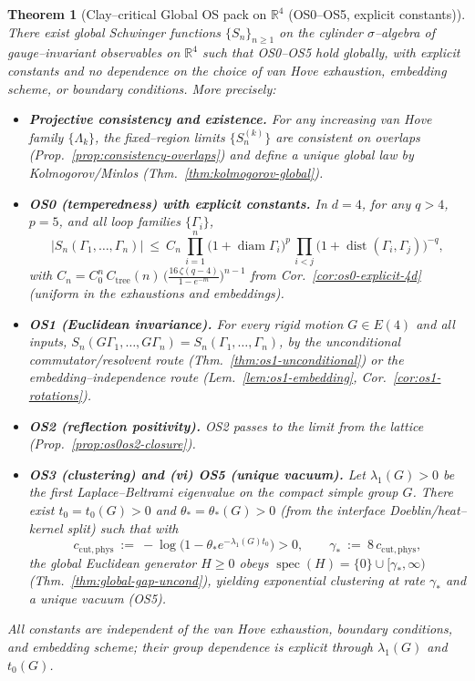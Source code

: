 \documentclass[11pt]{amsart}
\theoremstyle{plain}
\newtheorem{theorem}{Theorem}[section]
\theoremstyle{definition}
\theoremstyle{remark}
\begin{document}
\medskip
\begin{theorem}[Clay–critical Global OS pack on $\mathbb R^4$ (OS0--OS5, explicit constants)]\label{thm:global-os-clay}
There exist global Schwinger functions $\{S_n\}_{n\ge1}$ on the cylinder $\sigma$--algebra of gauge--invariant observables on $\mathbb R^4$ such that OS0--OS5 hold globally, with explicit constants and no dependence on the choice of van Hove exhaustion, embedding scheme, or boundary conditions. More precisely:
\begin{itemize}
  \item[(i)] \textbf{Projective consistency and existence.} For any increasing van Hove family $\{\Lambda_k\}$, the fixed–region limits $\{S_n^{(k)}\}$ are consistent on overlaps (Prop.~\ref{prop:consistency-overlaps}) and define a unique global law by Kolmogorov/Minlos (Thm.~\ref{thm:kolmogorov-global}).
  \item[(ii)] \textbf{OS0 (temperedness) with explicit constants.} In $d=4$, for any $q>4$, $p=5$, and all loop families $\{\Gamma_i\}$,
  \[
    |S_n(\Gamma_1,\ldots,\Gamma_n)|\ \le\ C_n\,\prod_{i=1}^n \bigl(1+\operatorname{diam}\Gamma_i\bigr)^p\,\prod_{i<j}\bigl(1+\operatorname{dist}(\Gamma_i,\Gamma_j)\bigr)^{-q},
  \]
  with $C_n=C_0^n\,C_{\mathrm{tree}}(n)\,\Big(\frac{16\,\zeta(q-4)}{1-e^{-m}}\Big)^{\!n-1}$ from Cor.~\ref{cor:os0-explicit-4d} (uniform in the exhaustions and embeddings).
  \item[(iii)] \textbf{OS1 (Euclidean invariance).} For every rigid motion $G\in E(4)$ and all inputs, $S_n(G\Gamma_1,\ldots,G\Gamma_n)=S_n(\Gamma_1,\ldots,\Gamma_n)$, by the unconditional commutator/resolvent route (Thm.~\ref{thm:os1-unconditional}) or the embedding–independence route (Lem.~\ref{lem:os1-embedding}, Cor.~\ref{cor:os1-rotations}).
  \item[(iv)] \textbf{OS2 (reflection positivity).} OS2 passes to the limit from the lattice (Prop.~\ref{prop:os0os2-closure}).
  \item[(v)] \textbf{OS3 (clustering) and (vi) OS5 (unique vacuum).} Let $\lambda_1(G)>0$ be the first Laplace–Beltrami eigenvalue on the compact simple group $G$. There exist $t_0=t_0(G)>0$ and $\theta_*=\theta_*(G)>0$ (from the interface Doeblin/heat–kernel split) such that with
  \[
    c_{\mathrm{cut,phys}}\ :=\ -\log\bigl(1-\theta_* e^{-\lambda_1(G) t_0}\bigr)>0,\qquad \gamma_*\ :=\ 8\,c_{\mathrm{cut,phys}},
  \]
  the global Euclidean generator $H\ge0$ obeys $\operatorname{spec}(H)=\{0\}\cup[\gamma_*,\infty)$ (Thm.~\ref{thm:global-gap-uncond}), yielding exponential clustering at rate $\gamma_*$ and a unique vacuum (OS5).
\end{itemize}
All constants are independent of the van Hove exhaustion, boundary conditions, and embedding scheme; their group dependence is explicit through $\lambda_1(G)$ and $t_0(G)$.
\end{theorem}
\end{document}
